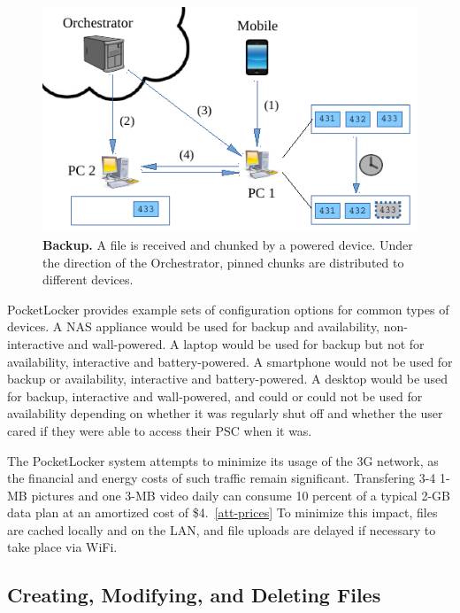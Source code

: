 \begin{figure}[t]

\includegraphics{./figures/backup.pdf}

\caption{\small \textbf{Backup.} A file is received and chunked by a powered
device.  Under the direction of the Orchestrator, pinned chunks are
distributed to different devices.}

\label{fig-design-backup}

\vspace*{-0.2in}
\end{figure}
PocketLocker provides example sets of configuration options for common types
of devices. A NAS appliance would be used for backup and availability,
non-interactive and wall-powered. A laptop would be used for backup but not
for availability, interactive and battery-powered. A smartphone would not be
used for backup or availability, interactive and battery-powered. A desktop
would be used for backup, interactive and wall-powered, and could or could
not be used for availability depending on whether it was regularly shut off
and whether the user cared if they were able to access their PSC when it was.

The PocketLocker system attempts to minimize its usage of the 3G network, as
the financial and energy costs of such traffic remain significant.  Transfering
3-4 1-MB pictures and one 3-MB video daily can consume 10 percent of a typical
2-GB data plan at an amortized cost of \$4.~\ref{att-prices} To minimize this
impact, files are cached locally and on the LAN, and file uploads are delayed
if necessary to take place via WiFi.

\subsection{Creating, Modifying, and Deleting Files}

